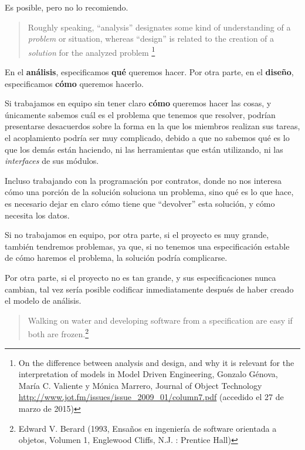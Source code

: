 Es posible, pero no lo recomiendo.

\begin{quote}
  Roughly speaking, “analysis” designates some kind of understanding of a \textit{problem} or situation, whereas “design” is related to the creation of a \textit{solution} for the analyzed problem \footnote{On the difference between analysis and design, and why it is relevant for the interpretation of models in Model Driven Engineering, Gonzalo Génova, María C. Valiente y Mónica Marrero, Journal of Object Technology \url{http://www.jot.fm/issues/issue_2009_01/column7.pdf} (accedido el 27 de marzo de 2015)}
\end{quote}

En el \textbf{análisis}, especificamos \textbf{qué} queremos hacer. Por otra parte, en el \textbf{diseño}, especificamos \textbf{cómo} queremos hacerlo.

Si trabajamos en equipo sin tener claro \textbf{cómo} queremos hacer las cosas, y únicamente sabemos cuál es el problema que tenemos que resolver, podrían presentarse desacuerdos sobre la forma en la que los miembros realizan sus tareas, el acoplamiento podría ser muy complicado, debido a que no sabemos qué es lo que los demás están haciendo, ni las herramientas que están utilizando, ni las \textit{interfaces} de sus módulos.

Incluso trabajando con la programación por contratos, donde no nos interesa cómo una porción de la solución soluciona un problema, sino qué es lo que hace, es necesario dejar en claro cómo tiene que ``devolver'' esta solución, y cómo necesita los datos.

Si no trabajamos en equipo, por otra parte, si el proyecto es muy grande, también tendremos problemas, ya que, si no tenemos una especificación estable de cómo haremos el problema, la solución podría complicarse.

Por otra parte, si el proyecto no es tan grande, y sus especificaciones nunca cambian, tal vez sería posible codificar inmediatamente después de haber creado el modelo de análisis.

\begin{quote}
  Walking on water and developing software from a specification are easy if both are frozen.\footnote{Edward V. Berard (1993, Ensaños en ingeniería de software orientada a objetos, Volumen 1, Englewood Cliffs, N.J. : Prentice Hall)}
\end{quote}

